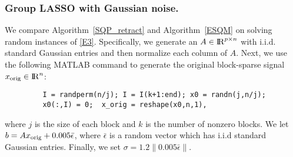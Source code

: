 \documentclass[10pt]{article}
\numberwithin{equation}{section}
\def\R{{\rm I\!R}}
\def\argmin{\mathop{\rm arg\,min}}
\def\d{{\rm dist}}
\def\xorig{{x_{\rm orig}}}
\begin{document}
%
\subsubsection{ Group LASSO with Gaussian noise. }
We compare Algorithm~\ref{SQP_retract} and Algorithm~\ref{ESQM} on solving random instances of \eqref{E3}. Specifically, we generate an $A\in \R^{p\times n}$ with i.i.d. standard Gaussian entries and then normalize each column of $A$. Next, we use the following MATLAB command to generate the original block-sparse signal $\xorig\in\R^n$:%
\begin{verbatim}
         I = randperm(n/j); I = I(k+1:end); x0 = randn(j,n/j);
         x0(:,I) = 0;  x_orig = reshape(x0,n,1),
\end{verbatim}
where $j$ is the size of each block and $k$ is the number of nonzero blocks. We let $b = A\xorig + 0.005\bar{\epsilon}$, where $\bar{\epsilon}$ is a random vector which has i.i.d standard Gaussian entries. Finally, we set $\sigma = 1.2\|0.005\bar{\epsilon}\|$.
\end{document}
